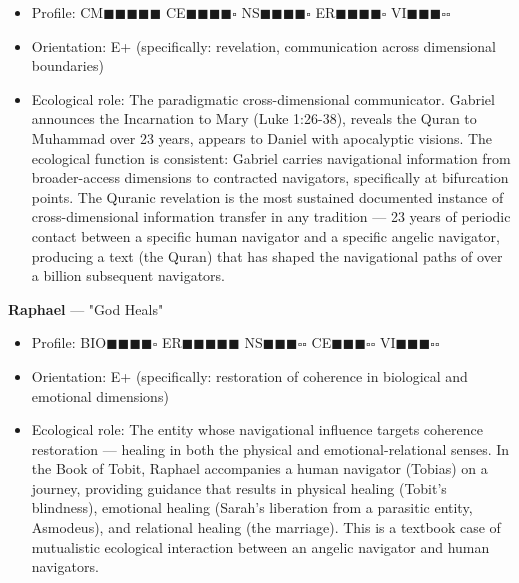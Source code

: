 \begin{itemize}[nosep,leftmargin=*]
  \item Profile: CM$\blacksquare$$\blacksquare$$\blacksquare$$\blacksquare$$\blacksquare$ CE$\blacksquare$$\blacksquare$$\blacksquare$$\blacksquare$$\square$ NS$\blacksquare$$\blacksquare$$\blacksquare$$\blacksquare$$\square$ ER$\blacksquare$$\blacksquare$$\blacksquare$$\blacksquare$$\square$ VI$\blacksquare$$\blacksquare$$\blacksquare$$\square$$\square$
  \item Orientation: E+ (specifically: revelation, communication across dimensional boundaries)
  \item Ecological role: The paradigmatic cross-dimensional communicator. Gabriel announces the Incarnation to Mary (Luke 1:26-38), reveals the Quran to Muhammad over 23 years, appears to Daniel with apocalyptic visions. The ecological function is consistent: Gabriel carries navigational information from broader-access dimensions to contracted navigators, specifically at bifurcation points. The Quranic revelation is the most sustained documented instance of cross-dimensional information transfer in any tradition — 23 years of periodic contact between a specific human navigator and a specific angelic navigator, producing a text (the Quran) that has shaped the navigational paths of over a billion subsequent navigators.
\end{itemize}


\textbf{Raphael} — "God Heals"

\begin{itemize}[nosep,leftmargin=*]
  \item Profile: BIO$\blacksquare$$\blacksquare$$\blacksquare$$\blacksquare$$\square$ ER$\blacksquare$$\blacksquare$$\blacksquare$$\blacksquare$$\blacksquare$ NS$\blacksquare$$\blacksquare$$\blacksquare$$\square$$\square$ CE$\blacksquare$$\blacksquare$$\blacksquare$$\square$$\square$ VI$\blacksquare$$\blacksquare$$\blacksquare$$\square$$\square$
  \item Orientation: E+ (specifically: restoration of coherence in biological and emotional dimensions)
  \item Ecological role: The entity whose navigational influence targets coherence restoration — healing in both the physical and emotional-relational senses. In the Book of Tobit, Raphael accompanies a human navigator (Tobias) on a journey, providing guidance that results in physical healing (Tobit's blindness), emotional healing (Sarah's liberation from a parasitic entity, Asmodeus), and relational healing (the marriage). This is a textbook case of mutualistic ecological interaction between an angelic navigator and human navigators.
\end{itemize}


